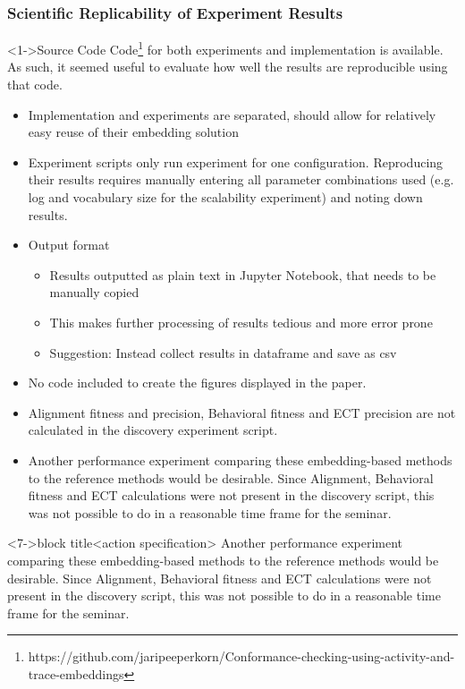 \documentclass{beamer}
\newcommand{\pro}{\item[\color{green}\textbf{+}\color{black}]}
\newcommand{\con}{\item[\color{red}\boldmath{$-$}\color{black}]}
\begin{document}
	\begin{frame}
		\frametitle{Scientific Replicability of Experiment Results}
		\begin{block}<1->{Source Code}
				 Code\footnote{https://github.com/jaripeeperkorn/Conformance-checking-using-activity-and-trace-embeddings} for both experiments and implementation is available. As such, it seemed useful to evaluate how well the results are reproducible using that code.
		\end{block}
		\begin{itemize}
			 \pro<2-> Implementation and experiments are separated, should allow for relatively easy reuse of their embedding solution
			 \con<3-> Experiment scripts only run experiment for one configuration. Reproducing their results requires manually entering all parameter combinations used (e.g. log and vocabulary size for the scalability experiment) and noting down results.
			 \con<4-> Output format
			 \begin{itemize}
			 	\item<4-> Results outputted as plain text in Jupyter Notebook, that needs to be manually copied
			 	\item<4-> This makes further processing of results tedious and more error prone
			 	\item<4-> Suggestion: Instead collect results in dataframe and save as csv
			 \end{itemize}
			 \con<5-> No code included to create the figures displayed in the paper.
			 \con<6-> Alignment fitness and precision, Behavioral fitness and ECT precision are not calculated in the discovery experiment script.
			 \item<7->\color{red}Another performance experiment comparing these embedding-based methods to the reference methods would be desirable. Since Alignment, Behavioral fitness and ECT calculations were not present in the discovery script, this was not possible to do in a reasonable time frame for the seminar.\color{black}
		\end{itemize}
	\begin{alertblock}<7->{block title}<action specification>
		Another performance experiment comparing these embedding-based methods to the reference methods would be desirable. Since Alignment, Behavioral fitness and ECT calculations were not present in the discovery script, this was not possible to do in a reasonable time frame for the seminar.
	\end{alertblock}
	\end{frame}
	
\end{document}
